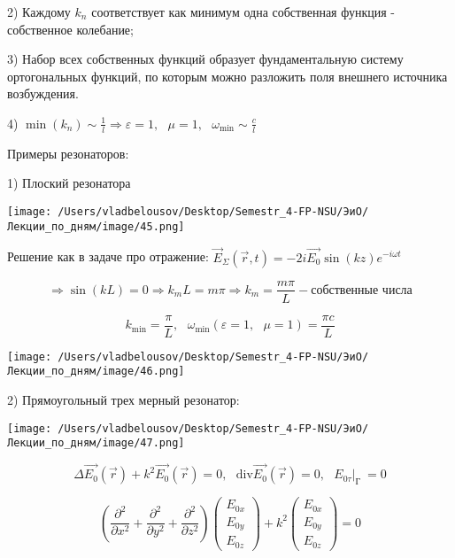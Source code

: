 \documentclass[12pt, a4paper]{report}
\begin{document}
2) Каждому \( k_n \) соответствует как минимум одна собственная функция -  собственное колебание;

3) Набор всех собственных  функций образует фундаментальную систему ортогональных функций, по которым можно разложить поля внешнего источника возбуждения. 

4) \(\displaystyle  \min (k_n ) \sim \frac{1}{l}  \Rightarrow \varepsilon = 1, \text{ }  \mu =1 , \text{ }\omega _{\min  } \sim \frac{c}{l}     \) 

Примеры резонаторов: 

1) Плоский резонатора

\begin{center}
    \texttt{[image: /Users/vladbelousov/Desktop/Semestr\_4-FP-NSU/ЭиО/Лекции\_по\_дням/image/45.png]}
\end{center}

Решение как в задаче про отражение: \( \displaystyle  \vec{E } _{\Sigma} ( \vec{r } , t ) = -2 i \vec{E_0} \sin (kz ) e^{ - i \omega t }  \) 

\[ \Rightarrow \sin (kL ) = 0 \Rightarrow k_m L = m \pi \Rightarrow k_m = \frac{m \pi }{L}   - \text{собственные числа}  \] 

\[ k_{\min  } = \frac{\pi}{ L }  , \text{ } \omega_{ \min } (\varepsilon = 1, \text{ }  \mu =1 )  = \frac{ \pi c }{L}   \] 

\begin{center}
    \texttt{[image: /Users/vladbelousov/Desktop/Semestr\_4-FP-NSU/ЭиО/Лекции\_по\_дням/image/46.png]}
\end{center}

2) Прямоугольный трех мерный резонатор: 

\begin{center}
    \texttt{[image: /Users/vladbelousov/Desktop/Semestr\_4-FP-NSU/ЭиО/Лекции\_по\_дням/image/47.png]}
\end{center}

\[ \Delta \vec{E_0 }(\vec{r } )  + k ^2 \vec{E_0 }(\vec{r } ) = 0 , \text{ }  \mathrm{div } \vec{E_0 }(\vec{r } ) = 0 , \text{ } E_{0 \tau} |_{\text{Г } }  = 0   \] 

\[ \left( \frac{\partial  ^2 }{\partial  x ^2 } + \frac{\partial  ^2 }{ \partial  y ^2 } + \frac{\partial  ^2 }{\partial  z ^2 }    \right) \begin{pmatrix}
    E_{0x}\\
    E_{0y} \\
    E_{0z} 
    \end{pmatrix} + k ^2 \begin{pmatrix}
        E_{0x}\\
        E_{0y} \\
        E_{0z} 
    \end{pmatrix} = 0\] 
\end{document}
